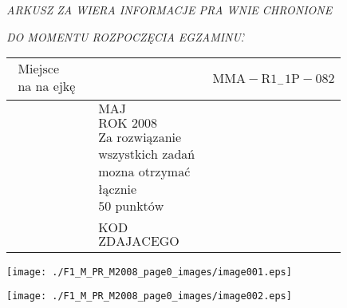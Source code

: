 \documentclass[a4paper,12pt]{article}
\begin{document}
{\it ARKUSZ ZA WIERA INFORMACJE PRA WNIE CHRONIONE}

{\it DO MOMENTU ROZPOCZĘCIA EGZAMINU}.'
\begin{center}
\begin{tabular}{|l|l|l}
\cline{1-1}
\multicolumn{1}{|l|}{$\begin{array}{l}\mbox{Miejsce}	\\	\mbox{na na ejkę}	\end{array}$}&	\multicolumn{1}{|l|}{}&	\multicolumn{1}{|l}{ $\mathrm{M}\mathrm{M}\mathrm{A}-\mathrm{R}1_{-}1\mathrm{P}-082$}	\\
\hline
&	\multicolumn{1}{|l}{$\begin{array}{l}\mbox{MAJ}	\\	\mbox{ROK 2008}	\\	\mbox{Za rozwiązanie}	\\	\mbox{wszystkich zadań}	\\	\mbox{mozna otrzymać}	\\	\mbox{łącznie}	\\	\mbox{50 punktów}	\end{array}$}	\\
\cline{3-3}
&	\multicolumn{1}{|l}{$\begin{array}{l}\mbox{KOD}	\\	\mbox{ZDAJACEGO}	\end{array}$}
\end{tabular}


\texttt{[image: ./F1\_M\_PR\_M2008\_page0\_images/image001.eps]}

\texttt{[image: ./F1\_M\_PR\_M2008\_page0\_images/image002.eps]}
\end{center}
\end{document}
